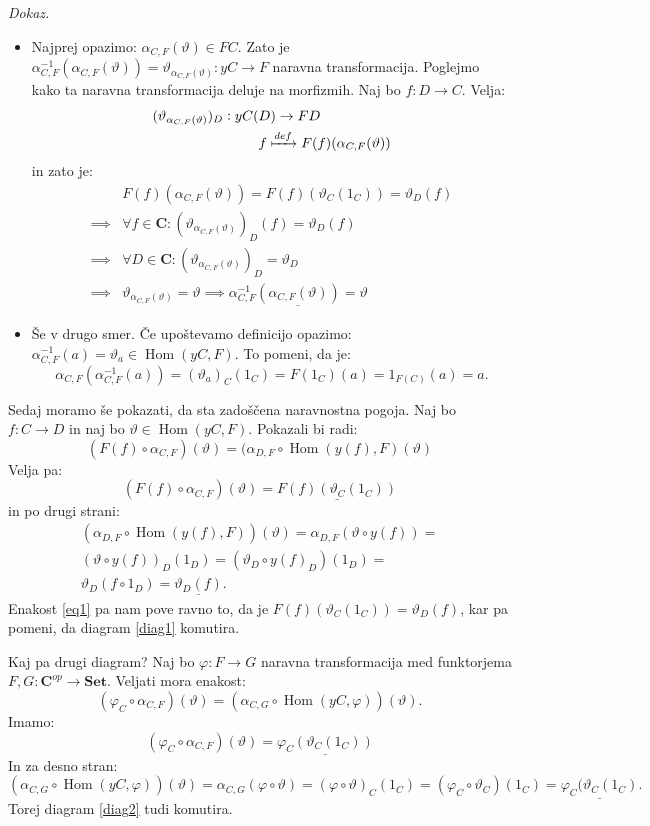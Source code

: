 \documentclass[12pt,a4paper]{book}
\theoremstyle{definition}
\theoremstyle{plain}
\newenvironment{dokaz}{\emph{Dokaz.}\ }{\hspace{\fill}{$\Box$}}
\theoremstyle{definition}
\theoremstyle{remark}
\newcommand{\cat}[1]{\textbf{#1}}
\DeclareMathOperator{\Hom}{Hom}
\begin{document}
\begin{dokaz}
\begin{itemize}
\item Najprej opazimo: $\alpha_{C,F}(\vartheta) \in FC$. Zato je $\alpha^{-1}_{C,F}(\alpha_{C,F}(\vartheta)) = \vartheta_{\alpha_{C,F}(\vartheta)}: yC \to F$ naravna transformacija.
%
Poglejmo kako ta naravna transformacija deluje na morfizmih. Naj bo $f : D \to C$. Velja:
\begin{align*}
(\vartheta_{\alpha_{C,F}(\vartheta)})_D : yC(&D) \to FD \\
&f \xmapsto{def} F(f)(\alpha_{C,F}(\vartheta))
\end{align*}
%
in zato je:
\begin{align*}
&F(f)(\alpha_{C,F}(\vartheta)) = F(f)(\vartheta_C(1_C)) = \vartheta_D(f) \\
\implies& \forall f \in \cat{C}  : (\vartheta_{\alpha_{C,F}(\vartheta)})_D(f) = \vartheta_D(f) \\
\implies& \forall D \in \cat{C} : (\vartheta_{\alpha_{C,F}(\vartheta)})_D = \vartheta_D \\
\implies& \vartheta_{\alpha_{C,F}(\vartheta)} = \vartheta
\implies \underline{\alpha^{-1}_{C,F}(\alpha_{C,F}(\vartheta)) = \vartheta}
\end{align*}
\item Še v drugo smer. Če upoštevamo definicijo opazimo: $\alpha^{-1}_{C,F}(a) = \vartheta_a \in \Hom(yC,F)$. To pomeni, da je:
$$\alpha_{C,F}(\alpha^{-1}_{C,F}(a)) = (\vartheta_a)_C(1_C) = F(1_C)(a) = 1_{F(C)}(a) = a.$$
\end{itemize}
%
Sedaj moramo še pokazati, da sta zadoščena naravnostna pogoja.
Naj bo $f : C \to D$ in naj bo $\vartheta \in \Hom(yC,F)$.
Pokazali bi radi:
\begin{equation}
(F(f) \circ \alpha_{C,F})(\vartheta) = (\alpha_{D,F} \circ \Hom(y(f),F)(\vartheta)
\end{equation}
Velja pa:
$$(F(f) \circ \alpha_{C,F})(\vartheta) = \underline{F(f)(\vartheta_C(1_C))}$$
in po drugi strani:
\begin{align*}
(\alpha_{D,F} \circ \Hom(y(f),F))(\vartheta) = \alpha_{D,F}(\vartheta \circ y(f)) = \\
(\vartheta \circ y(f))_D (1_D) = (\vartheta_D \circ y(f)_D)(1_D) = \\
\vartheta_D(f \circ 1_D) = \underline{\vartheta_D(f)}.
\end{align*}
Enakost \ref{eq1} pa nam pove ravno to, da je $F(f)(\vartheta_C(1_C)) = \vartheta_D(f)$, kar pa pomeni, da diagram \ref{diag1} komutira.

Kaj pa drugi diagram? Naj bo $\varphi : F \to G$ naravna transformacija med funktorjema $F,G : \cat{C}^{op} \to \cat{Set}$.
Veljati mora enakost:
$$(\varphi_C \circ \alpha_{C,F})(\vartheta) = (\alpha_{C,G} \circ \Hom(yC,\varphi))(\vartheta).$$
Imamo:
$$(\varphi_C \circ \alpha_{C,F})(\vartheta) = \underline{\varphi_C(\vartheta_C(1_C))}$$
In za desno stran:
$$(\alpha_{C,G} \circ \Hom(yC,\varphi))(\vartheta) = \alpha_{C,G}(\varphi \circ \vartheta) = 
(\varphi \circ \vartheta)_C(1_C) = (\varphi_C \circ \vartheta_C)(1_C) = \underline{\varphi_C(\vartheta_C(1_C)}.$$
Torej diagram \ref{diag2} tudi komutira.
\end{dokaz}
\end{document}
